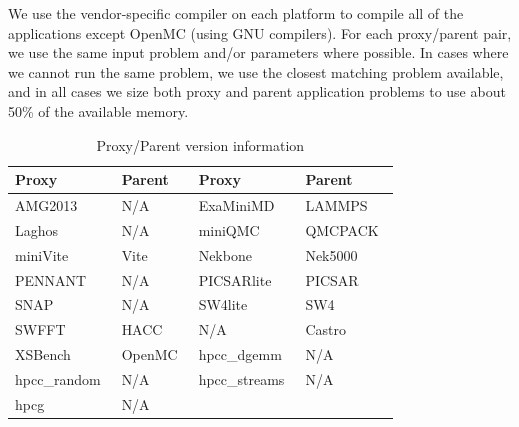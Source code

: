 \documentclass[conference]{IEEEtran}
\begin{document}
We use the vendor-specific compiler on each platform to compile all of the applications except OpenMC (using GNU compilers). For each proxy/parent pair, we use the same input problem and/or parameters where possible. In cases where we cannot run the same problem, we use the closest matching problem available, and in all cases we size both proxy and parent application problems to use about 50\% of the available memory. 
\begin{table}[!t]
\caption{Proxy/Parent version information}
\label{tab:version}
\centering
\begin{tabular}{ll|ll}
\toprule
\textbf{Proxy} & \textbf{Parent} & \textbf{Proxy} & \textbf{Parent}  \\ 
\midrule
AMG2013~\cite{AMG}      &  \cellcolor{Gray!50}N/A        & ExaMiniMD~\cite{ostiExaMiniMD}      &  \cellcolor{Gray!50}LAMMPS~\cite{LAMMPS}    \\
Laghos~\cite{Laghos}         & \cellcolor{Gray!50}N/A        & miniQMC~\cite{richards2018fy18}         & \cellcolor{Gray!50}QMCPACK~\cite{qmcpack}   \\
miniVite~\cite{miniVite}       & \cellcolor{Gray!50}Vite~\cite{Vite}       &  Nekbone        & \cellcolor{Gray!50}Nek5000~\cite{Nek5000}     \\
PENNANT         & \cellcolor{Gray!50}N/A      & PICSARlite      &\cellcolor{Gray!50}PICSAR~\cite{PICSAR}       \\
SNAP            & \cellcolor{Gray!50}N/A       & SW4lite ~\cite{ECPProxySuite1}        & \cellcolor{Gray!50}SW4~\cite{SW42}       \\
SWFFT~\cite{ECPProxySuite1}          & \cellcolor{Gray!50}HACC~\cite{HACC}      & N/A            &\cellcolor{Gray!50}Castro~\cite{Castro}      \\
XSBench~\cite{XSBench}        & \cellcolor{Gray!50}OpenMC~\cite{OpenMC}    & hpcc\_dgemm~\cite{hpcc}   & \cellcolor{Gray!50}N/A        \\
hpcc\_random~\cite{hpcc}    & \cellcolor{Gray!50}N/A        & hpcc\_streams~\cite{hpcc}   &\cellcolor{Gray!50}N/A       \\
hpcg ~\cite{hpcg}          & \cellcolor{Gray!50}N/A           \\ 
\bottomrule
\end{tabular}
\end{table}
\end{document}
